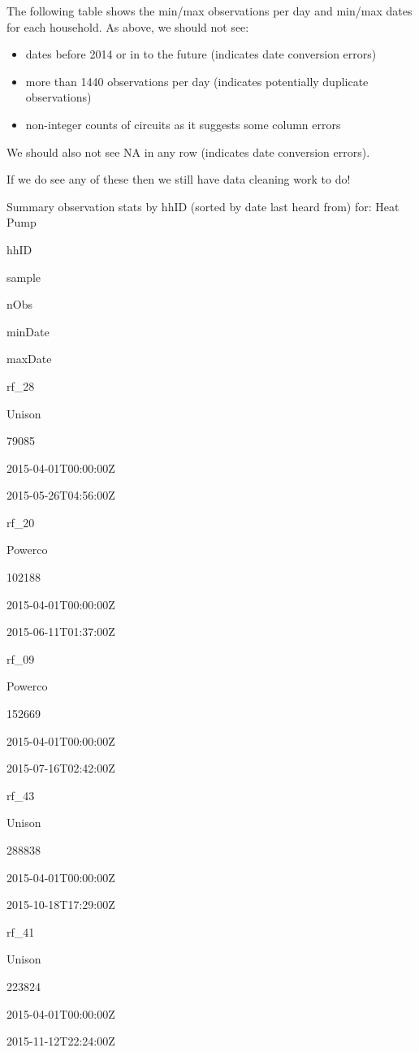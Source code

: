 \documentclass[]{article}
\providecommand{\tightlist}{%
  \setlength{\itemsep}{0pt}\setlength{\parskip}{0pt}}
\begin{document}
The following table shows the min/max observations per day and min/max
dates for each household. As above, we should not see:

\begin{itemize}
\tightlist
\item
  dates before 2014 or in to the future (indicates date conversion
  errors)
\item
  more than 1440 observations per day (indicates potentially duplicate
  observations)
\item
  non-integer counts of circuits as it suggests some column errors
\end{itemize}

We should also not see NA in any row (indicates date conversion errors).

If we do see any of these then we still have data cleaning work to do!

Summary observation stats by hhID (sorted by date last heard from) for:
Heat Pump

hhID

sample

nObs

minDate

maxDate

rf\_28

Unison

79085

2015-04-01T00:00:00Z

2015-05-26T04:56:00Z

rf\_20

Powerco

102188

2015-04-01T00:00:00Z

2015-06-11T01:37:00Z

rf\_09

Powerco

152669

2015-04-01T00:00:00Z

2015-07-16T02:42:00Z

rf\_43

Unison

288838

2015-04-01T00:00:00Z

2015-10-18T17:29:00Z

rf\_41

Unison

223824

2015-04-01T00:00:00Z

2015-11-12T22:24:00Z
\end{document}
